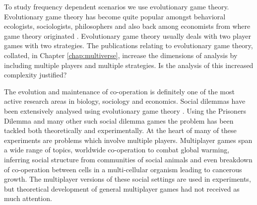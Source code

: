\documentclass[oneside,11pt,a4paper]{book}
\begin{document}
To study frequency dependent scenarios we use evolutionary game theory.
Evolutionary game theory has become quite popular amongst behavioral ecologists, sociologists, philosophers and also back among economists from where game theory originated \citep{hammerstein:2005aa}.
Evolutionary game theory usually deals with two player games with two strategies.
The publications relating to evolutionary game theory, collated, in Chapter \ref{chap:multiverse}, increase the dimensions of analysis by including multiple players and multiple strategies.
Is the analysis of this increased complexity justified?

The evolution and maintenance of co-operation is definitely one of the most active research areas in biology, sociology and economics.
Social dilemmas have been extensively analysed using evolutionary game theory \citep{ostrom:1990bo,nowak:2006pw,taylor:2007bb}.
Using the Prisoners Dilemma and many other such social dilemma games the problem has been tackled both theoretically and experimentally.
At the heart of many of these experiments are problems which involve multiple players.
Multiplayer games span a wide range of topics, worldwide co-operation to combat global warming, inferring social structure from communities of social animals and even breakdown of co-operation between cells in a multi-cellular organism leading to cancerous growth.
The multiplayer versions of these social settings are used in experiments, but theoretical development of general multiplayer games had not received as much attention.
\end{document}
